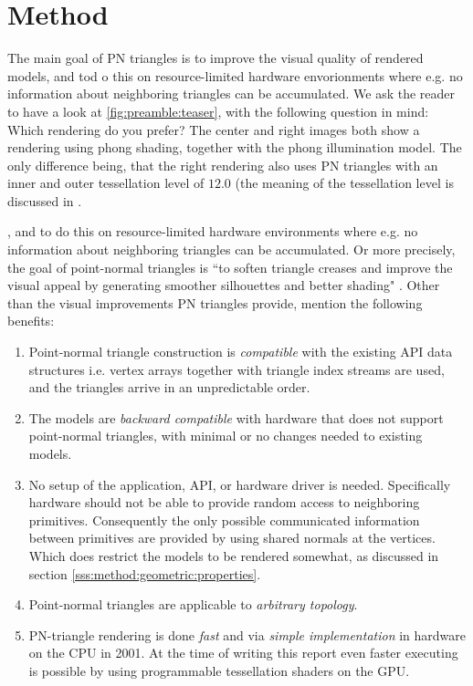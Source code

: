 
\section{Method}
\label{s:method}

The main goal of PN triangles is to improve the visual quality of rendered models, and tod o this on resource-limited hardware envorionments where e.g. no information about neighboring triangles can be accumulated. We ask the reader to have a look at \cref{fig:preamble:teaser}, with the following question in mind: Which rendering do you prefer? The center and right images both show a rendering using phong shading, together with the phong illumination model. The only difference being, that the right rendering also uses PN triangles with an inner and outer tessellation level of $12.0$ (the meaning of the tessellation level is discussed in . 

, and to do this on resource-limited hardware environments where e.g. no information about neighboring triangles can be accumulated. Or more precisely, the goal of point-normal triangles is ``to soften triangle creases and improve the visual appeal by generating smoother silhouettes and better shading" \cite{vlachos2001curved}. Other than the visual improvements PN triangles provide, \citeauthor{vlachos2001curved} mention the following benefits:

\begin{enumerate}[label=(\roman*)]
 	\item 
 		Point-normal triangle construction is \textit{compatible} with the existing API data structures i.e. vertex arrays together with triangle index streams are used, and the triangles arrive in an unpredictable order.
 	\item 
 		The models are \textit{backward compatible} with hardware that does not support point-normal triangles, with minimal or no changes needed to existing models.
 	\item 
 		No setup of the application, API, or hardware driver is needed. Specifically hardware should not be able to provide random access to neighboring primitives. Consequently the only possible communicated information between primitives are provided by using shared normals at the vertices. Which does restrict the models to be rendered somewhat, as discussed in section \ref{sss:method:geometric:properties}.
 	\item 
 		Point-normal triangles are applicable to \textit{arbitrary topology}.
 	\item 
 		PN-triangle rendering is done \textit{fast} and via \textit{simple implementation} in hardware on the CPU in 2001. At the time of writing this report even faster executing is possible by using programmable tessellation shaders on the GPU.
 \end{enumerate} 


